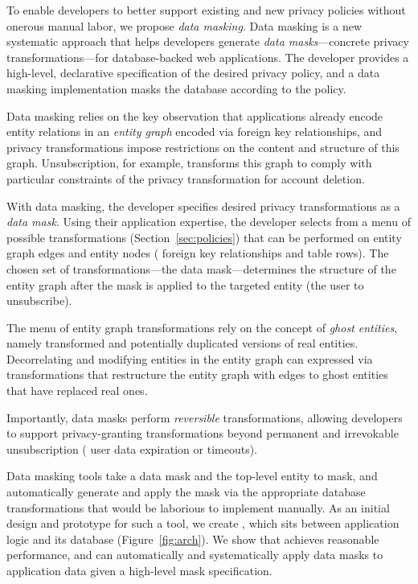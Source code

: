 To enable developers to better support existing and new privacy policies without onerous manual
labor, we propose \emph{data masking}.
%
Data masking is a new systematic approach that helps developers generate
\emph{data masks}---concrete privacy transformations---for database-backed web applications. The
developer provides a high-level, declarative specification of the desired privacy policy, and a data
masking implementation masks the database according to the policy.

Data masking relies on the key observation that applications already encode entity relations in an
\emph{entity graph} encoded via \eg foreign key relationships, and privacy transformations impose
restrictions on the content and structure of this graph. Unsubscription, for example, transforms
this graph to comply with particular constraints of the privacy transformation for account deletion.

With data masking, the developer specifies desired privacy transformations as a \emph{data mask}.
Using their application expertise, the developer selects from a menu of possible transformations
(Section~\ref{sec:policies}) that can be performed on entity graph edges and entity nodes (\eg
foreign key relationships and table rows). The chosen set of transformations---the data
mask---determines the structure of the entity graph after the mask is applied to the targeted entity
(\eg the user to unsubscribe).

The menu of entity graph transformations rely on the concept of \emph{ghost entities}, namely
transformed and potentially duplicated versions of real entities. Decorrelating and modifying
entities in the entity graph can expressed via transformations that restructure the entity graph
with edges to ghost entities that have replaced real ones.

Importantly, data masks perform \emph{reversible} transformations, allowing developers to support
privacy-granting transformations beyond permanent and irrevokable unsubscription (\eg
user data expiration or timeouts).

Data masking tools take a data mask and the top-level entity to mask, and automatically generate and
apply the mask via the appropriate database transformations that would be laborious to implement
manually.
As an initial design and prototype for such a tool, we create \sys, which sits between application
logic and its database (Figure~\ref{fig:arch}). We show that \sys achieves reasonable performance,
and can automatically and systematically apply data masks to application data given a high-level
mask specification.

